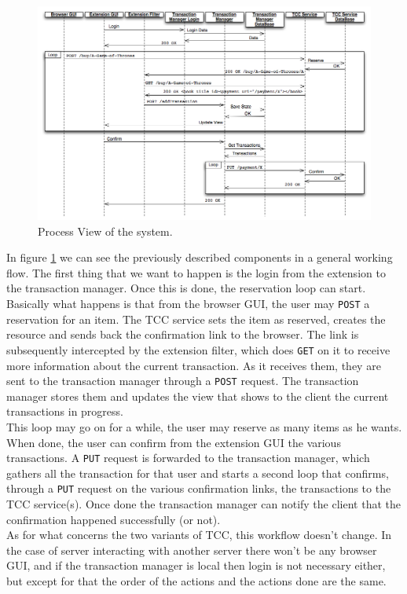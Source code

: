 \begin{figure} [ht]
\centering
\includegraphics[scale=0.5]{images/process_view.jpg}
\caption{Process View of the system.}
\label{tcc-process-view}
\end{figure}

In figure \ref{tcc-process-view} we can see the previously described components in a general working flow. The first thing that we want to happen is the login from the extension to the transaction manager. Once this is done, the reservation loop can start. Basically what happens is that from the browser GUI, the user may {\tt POST} a reservation for an item. The TCC service sets the item as reserved, creates the resource and sends back the confirmation link to the browser. The link is subsequently intercepted by the extension filter, which does {\tt GET} on it to receive more information about the current transaction. As it receives them, they are sent to the transaction manager through a {\tt POST} request. The transaction manager stores them and updates the view that shows to the client the current transactions in progress.\\
This loop may go on for a while, the user may reserve as many items as he wants. When done, the user can confirm from the extension GUI the various transactions. A {\tt PUT} request is forwarded to the transaction manager, which gathers all the transaction for that user and starts a second loop that confirms, through a {\tt PUT} request on the various confirmation links, the transactions to the TCC service(s). Once done the transaction manager can notify the client that the confirmation happened successfully (or not).\\
As for what concerns the two variants of TCC, this workflow doesn't change. In the case of server interacting with another server there won't be any browser GUI, and if the transaction manager is local then login is not necessary either, but except for that the order of the actions and the actions done are the same.

